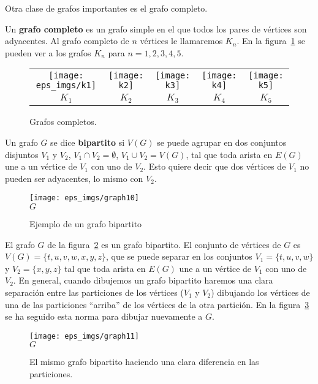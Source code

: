 Otra clase de grafos importantes es el grafo completo.

\begin{definicion}
Un {\bf grafo completo} es un grafo simple en el que todos los pares de vértices son adyacentes.
Al grafo completo de $n$ vértices le llamaremos $K_n$.
En la figura~\ref{fig:cliques} se pueden ver a los grafos $K_n$ para $n=1,2,3,4,5$.
\begin{figure}[h!]
\centering
\begin{tabular}{ccccc}
\texttt{[image: eps\_imgs/k1]}&\texttt{[image: k2]}&\texttt{[image: k3]}&\texttt{[image: k4]}&\texttt{[image: k5]}\\
$K_1$ & $K_2$ & $K_3$ & $K_4$ & $K_5$
\end{tabular}
\caption{Grafos completos.}
\label{fig:cliques}
\end{figure}
\end{definicion}

\begin{definicion}
Un grafo $G$ se dice {\bf bipartito} si $V(G)$ se puede agrupar en dos conjuntos disjuntos $V_1$ y $V_2$, $V_1\cap V_2=\emptyset$, $V_1\cup V_2=V(G)$, tal que toda arista en $E(G)$ une a un vértice de $V_1$ con uno de $V_2$.
Esto quiere decir que dos vértices de $V_1$ no pueden ser adyacentes, lo mismo con $V_2$.
\end{definicion}
\begin{figure}[h!]
\centering
\texttt{[image: eps\_imgs/graph10]}\\
$G$
\caption{Ejemplo de un grafo bipartito}
\label{fig:graph10}
\end{figure}

\begin{ejemplo}
El grafo $G$ de la figura~\ref{fig:graph10} es un grafo bipartito.
El conjunto de vértices de $G$ es $V(G)=\{t,u,v,w,x,y,z\}$, que se puede separar en los conjuntos $V_1=\{t,u,v,w\}$ y $V_2=\{x,y,z\}$ tal que toda arista en $E(G)$ une a un vértice de $V_1$ con uno de $V_2$.
En general, cuando dibujemos un grafo bipartito haremos una clara separación entre las particiones de los vértices ($V_1$ y $V_2$) dibujando los vértices de una de las particiones ``arriba'' de los vértices de la otra partición.
En la figura~\ref{fig:graph11} se ha seguido esta norma para dibujar nuevamente a $G$.
\begin{figure}[h!]
\centering
\texttt{[image: eps\_imgs/graph11]}\\
$G$
\caption{El mismo grafo bipartito haciendo una clara diferencia en las particiones.}
\label{fig:graph11}
\end{figure}  
\end{ejemplo}

